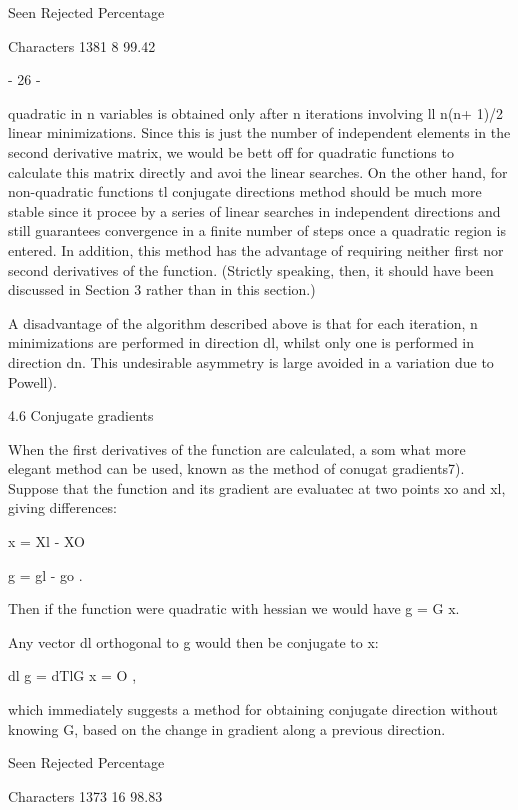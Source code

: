                  Seen Rejected  Percentage
 
Characters       1381        8   99.42
 
                                - 26 -
 
 
quadratic in n variables is obtained only after n iterations involving
ll n(n+ 1)/2 linear minimizations.  Since this is just the number of
independent elements in the second derivative matrix, we would be bett
off for quadratic functions to calculate this matrix directly and avoi
the linear searches.  On the other hand, for non-quadratic functions tl
conjugate directions method should be much more stable since it procee
by a series of linear searches in independent directions and still
guarantees convergence in a finite number of steps once a quadratic
region is entered.  In addition, this method has the advantage of
requiring neither first nor second derivatives of the function.
(Strictly speaking, then, it should have been discussed in Section 3
rather than in this section.)
 
      A disadvantage of the algorithm described above is that for each
iteration, n minimizations are performed in direction dl, whilst only
one is performed in direction dn.  This undesirable asymmetry is large
avoided in a variation due to Powell).
 
 
4.6  Conjugate gradients
 
      When the first derivatives of the function are calculated, a som
what more elegant method can be used, known as the method of conugat
gradients7). Suppose that the function and its gradient are evaluatec
at two points xo and xl, giving differences:
 
 
                                                         x = Xl - XO
 
                            g = gl - go .
 
 
Then if the function were quadratic with hessian  we would have
                                g = G x.
 
 
Any vector dl orthogonal to g would then be conjugate to x:
 
 
                         dl g = dTlG x = O ,
 
 
which immediately suggests a method for obtaining conjugate direction
without knowing G, based on the change in gradient along a previous
direction.
 
                 Seen Rejected  Percentage
 
Characters       1373       16   98.83
 
